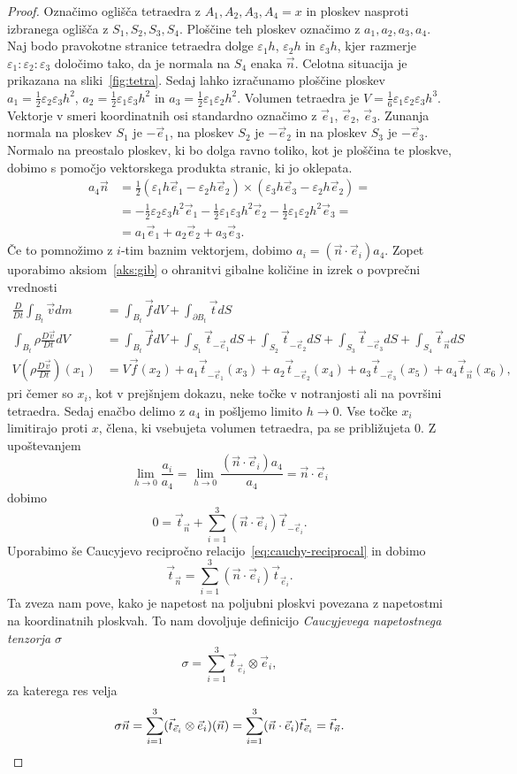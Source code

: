 \documentclass[12pt,a4paper,twoside]{article}
\theoremstyle{definition} %
\theoremstyle{plain} %
\numberwithin{equation}{section}
\newcommand{\eps}{\varepsilon}
\newcommand{\DD}[2]{\ensuremath{\frac{D #1}{D #2}}}
\newcommand{\DDt}[1]{\DD{#1}{t}}
\newcommand{\vv}{\vec{v}}
\newcommand{\vt}{\vec{t}}
\newcommand{\vn}{\vec{n}}
\newcommand{\vf}{\vec{f}}
\newcommand{\vx}{x}
\newcommand{\ei}{\vec{e}_1}
\newcommand{\ej}{\vec{e}_2}
\newcommand{\ek}{\vec{e}_3}
\newcommand{\ts}{\sigma}
\begin{document}
\begin{proof}
Označimo oglišča tetraedra z $A_1, A_2, A_3, A_4 = \vx$ in ploskev nasproti izbranega
oglišča z $S_1, S_2, S_3, S_4$. Ploščine teh ploskev označimo z
$a_1, a_2, a_3, a_4$.  Naj bodo pravokotne stranice tetraedra
dolge $\eps_1 h$, $\eps_2 h$ in $\eps_3 h$, kjer razmerje $\eps_1 : \eps_2 : \eps_3$
določimo tako, da je normala na $S_4$ enaka $\vn$.
Celotna situacija je prikazana na sliki~\ref{fig:tetra}.
Sedaj lahko izračunamo ploščine ploskev $a_1 = \frac12 \eps_2\eps_3h^2$,
$a_2 = \frac12 \eps_1\eps_3h^2$ in $a_3 = \frac12 \eps_1\eps_2h^2$.
Volumen tetraedra je $V = \frac16 \eps_1\eps_2\eps_3h^3$.
Vektorje v smeri koordinatnih osi standardno označimo z $\ei$, $\ej$, $\ek$.
Zunanja normala na ploskev $S_1$ je $-\ei$, na ploskev $S_2$ je $-\ej$ in na
ploskev $S_3$ je $-\ek$. Normalo na preostalo ploskev, ki bo dolga ravno toliko,
kot je ploščina te ploskve, dobimo s pomočjo vektorskega produkta
stranic, ki jo oklepata.
\begin{align*}
  a_4\vn &= \frac12 (\eps_1h \ei - \eps_2h \ej) \times (\eps_3h \ek - \eps_2h
  \ej) = \\ &=
  -\frac12 \eps_2\eps_3 h^2\ei
  -\frac12 \eps_1\eps_3 h^2\ej
  -\frac12 \eps_1\eps_2 h^2\ek = \\
  &= a_1 \ei + a_2 \ej + a_3 \ek.
\end{align*}
Če to pomnožimo z $i$-tim baznim vektorjem, dobimo $a_i = (\vn\cdot\vec{e}_i)
a_4$.
Zopet uporabimo aksiom~\ref{aks:gib} o ohranitvi gibalne količine in izrek o
povprečni vrednosti
\begin{align*}
  \DDt{} \int_{B_t} \vv dm &= \int_{B_t} \vf dV + \int_{\partial {B_t}} \vt dS \\
\int_{B_t} \rho\DDt{\vv} dV &= \int_{B_t} \vf dV +
  \int_{S_1} \vt_{-\ei} dS +
  \int_{S_2} \vt_{-\ej} dS +
  \int_{S_3} \vt_{-\ek} dS +
  \int_{S_4} \vt_{\vn} dS
  \\
  V (\rho\DDt{\vv})(\vx_1) &= V \vf(\vx_2) +
  a_1 \vt_{-\ei}(\vx_3) + a_2 \vt_{-\ej}(\vx_4) + a_3 \vt_{-\ek}(\vx_5) + a_4
  \vt_{\vn}(\vx_6),
\end{align*}
pri čemer so $\vx_i$, kot v prejšnjem dokazu, neke točke v notranjosti ali na
površini tetraedra. Sedaj enačbo delimo z $a_4$ in pošljemo limito $h \to 0$.
Vse točke $\vx_i$ limitirajo proti $\vx$, člena, ki vsebujeta volumen tetraedra,
pa se približujeta 0. Z upoštevanjem
\[
  \lim_{h\to0} \frac{a_i}{a_4} = \lim_{h\to0}\frac{(\vn\cdot\vec{e}_i) a_4}{a_4}
  = \vn\cdot\vec{e}_i
\]
dobimo
\[
  0 = \vt_{\vn} + \sum_{i=1}^3 (\vn \cdot\vec{e}_i) \vt_{-\vec{e}_i}.
\]
Uporabimo še Caucyjevo recipročno relacijo~\eqref{eq:cauchy-reciprocal} in dobimo
\[
  \vt_{\vn} = \sum_{i=1}^3 (\vn \cdot\vec{e}_i) \vt_{\vec{e}_i}.
\]
Ta zveza nam pove, kako je napetost na poljubni ploskvi povezana z napetostmi na
koordinatnih ploskvah.
To nam dovoljuje definicijo \emph{Caucyjevega napetostnega tenzorja}
$\ts$
\[
  \ts = \sum_{i=1}^3 \vt_{\vec{e}_i}\otimes \vec{e}_i,
\]
za katerega res velja
\[
  \ts\vn = \sum_{i=1}^3 (\vt_{\vec{e}_i}\otimes \vec{e}_i)(\vn) =
  \sum_{i=1}^3 (\vn \cdot\vec{e}_i) \vt_{\vec{e}_i} = \vt_{\vn}. \qedhere
\]
\end{proof}
\end{document}
